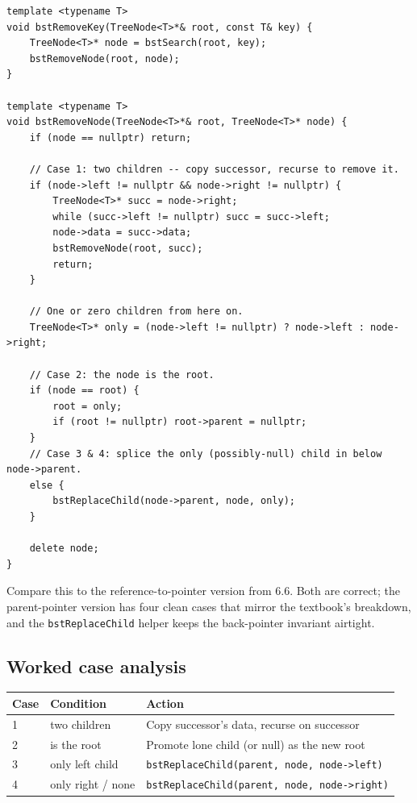 \documentclass[11pt]{article}
\begin{document}
\begin{lstlisting}
template <typename T>
void bstRemoveKey(TreeNode<T>*& root, const T& key) {
    TreeNode<T>* node = bstSearch(root, key);
    bstRemoveNode(root, node);
}

template <typename T>
void bstRemoveNode(TreeNode<T>*& root, TreeNode<T>* node) {
    if (node == nullptr) return;

    // Case 1: two children -- copy successor, recurse to remove it.
    if (node->left != nullptr && node->right != nullptr) {
        TreeNode<T>* succ = node->right;
        while (succ->left != nullptr) succ = succ->left;
        node->data = succ->data;
        bstRemoveNode(root, succ);
        return;
    }

    // One or zero children from here on.
    TreeNode<T>* only = (node->left != nullptr) ? node->left : node->right;

    // Case 2: the node is the root.
    if (node == root) {
        root = only;
        if (root != nullptr) root->parent = nullptr;
    }
    // Case 3 & 4: splice the only (possibly-null) child in below node->parent.
    else {
        bstReplaceChild(node->parent, node, only);
    }

    delete node;
}
\end{lstlisting}

Compare this to the reference-to-pointer version from 6.6. Both are correct; the parent-pointer version has four clean cases that mirror the textbook's breakdown, and the \texttt{bstReplaceChild} helper keeps the back-pointer invariant airtight.

\subsection*{Worked case analysis}

\begin{center}
\begin{tabular}{lll}
Case & Condition & Action \\
\hline
1 & two children       & Copy successor's data, recurse on successor \\
2 & is the root        & Promote lone child (or null) as the new root \\
3 & only left child    & \texttt{bstReplaceChild(parent, node, node->left)} \\
4 & only right / none  & \texttt{bstReplaceChild(parent, node, node->right)} \\
\end{tabular}
\end{center}
\end{document}
